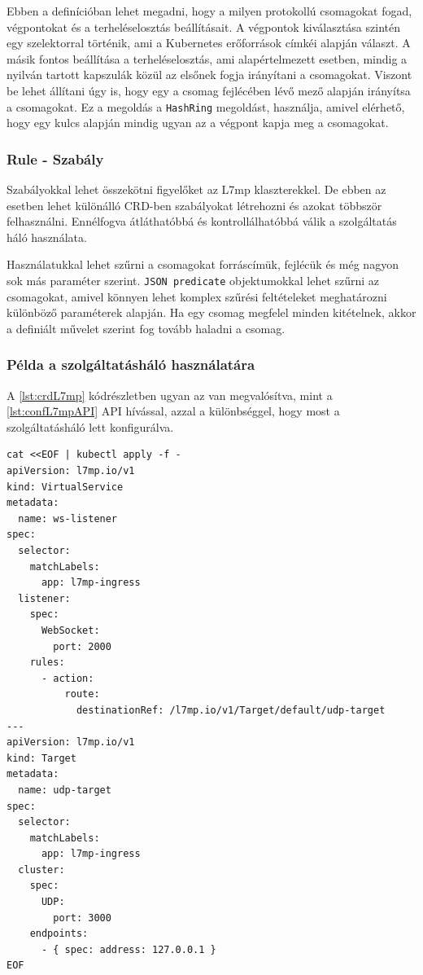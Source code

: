 Ebben a definícióban lehet megadni, hogy a milyen protokollú csomagokat fogad, végpontokat
és a terheléselosztás beállításait. A végpontok kiválasztása szintén egy szelektorral
történik, ami a Kubernetes erőforrások címkéi alapján választ. A másik fontos beállítása
a terheléselosztás, ami alapértelmezett esetben, mindig a nyilván tartott kapszulák 
közül az elsőnek fogja irányítani a csomagokat. Viszont be lehet állítani úgy is, hogy
egy a csomag fejlécében lévő mező alapján irányítsa a csomagokat. Ez a megoldás a
\texttt{HashRing} megoldást, használja, amivel elérhető, hogy egy kulcs alapján mindig 
ugyan az a végpont kapja meg a csomagokat. 

\subsubsection{Rule - Szabály}

Szabályokkal lehet összekötni figyelőket az L7mp klaszterekkel. De ebben az esetben lehet 
különálló CRD-ben szabályokat létrehozni és azokat többször felhasználni. Ennélfogva 
átláthatóbbá és kontrollálhatóbbá válik a szolgáltatás háló használata. 

Használatukkal lehet szűrni a csomagokat forráscímük, fejlécük és még nagyon sok más 
paraméter szerint. \texttt{JSON predicate} objektumokkal lehet szűrni az csomagokat, 
amivel könnyen lehet komplex szűrési feltételeket meghatározni különböző paraméterek 
alapján. Ha egy csomag megfelel minden kitételnek, akkor a definiált művelet szerint fog 
tovább haladni a csomag.

\subsubsection{Példa a szolgáltatásháló használatára}

A \ref{lst:crdL7mp} kódrészletben ugyan az van megvalósítva, mint a \ref{lst:confL7mpAPI}
API hívással, azzal a különbséggel, hogy most a szolgáltatásháló lett konfigurálva. 

\begin{lstlisting}[caption=L7mp szolgáltatásháló konfigurálása CRD-n keresztül, label=lst:crdL7mp]
cat <<EOF | kubectl apply -f -
apiVersion: l7mp.io/v1
kind: VirtualService
metadata:
  name: ws-listener
spec:
  selector:
    matchLabels:
      app: l7mp-ingress
  listener:
    spec:
      WebSocket:
        port: 2000
    rules:
      - action:
          route:
            destinationRef: /l7mp.io/v1/Target/default/udp-target
---
apiVersion: l7mp.io/v1
kind: Target
metadata:
  name: udp-target
spec:
  selector:
    matchLabels:
      app: l7mp-ingress
  cluster:
    spec:
      UDP:
        port: 3000
    endpoints:
      - { spec: address: 127.0.0.1 }
EOF
\end{lstlisting}

